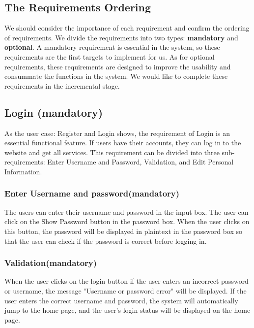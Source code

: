 \documentclass[conference]{IEEEtran}
\begin{document}
\subsection{ The Requirements Ordering }

We should consider the importance of each requirement and confirm the ordering of requirements.
We divide the requirements into two types: \textbf{mandatory} and \textbf{optional}. A mandatory requirement 
is essential in the system, so these requirements are the first targets to implement for us.
As for optional requirements, these requirements are designed to improve the usability and consummate
the functions in the system. We would like to complete these requirements in the incremental stage.


\subsection{ Login (mandatory)}

As the user case: Register and Login shows, the requirement of Login is an essential functional feature. If users have their accounts, they can log in to the website and get all services. This requirement can be divided into three sub-requirements: 
Enter Username and Password, Validation, and Edit Personal Information.

\subsubsection{ Enter Username and password(mandatory)}

The users can enter their username and password in the input box. The 
user can click on the Show Password button in the password box. When the user 
clicks on this button, the password will be displayed in plaintext in the password 
box so that the user can check if the password is correct before logging in.

\subsubsection{ Validation(mandatory) }

When the user clicks on the login button if the user enters an incorrect 
password or username, the message "Username or password error" will be 
displayed. If the user enters the correct username and password, the system 
will automatically jump to the home page, and the user's login status will be 
displayed on the home page.
\end{document}
